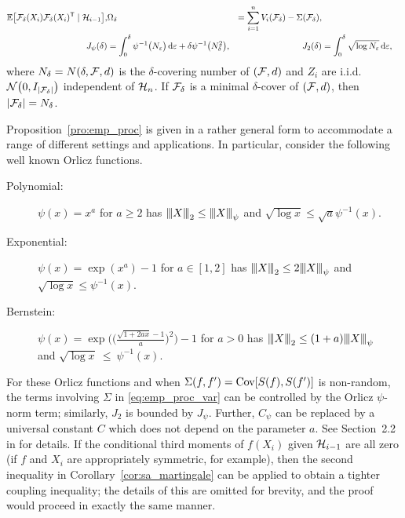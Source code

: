\begin{proposition}
\begin{align*}
    \mathbb{E}\big[\mathcal{F}_\delta(X_i) \mathcal{F}_\delta(X_i)^{\mathsf{T}} \mid \mathcal{H}_{i-1} \big],
    &
    \Omega_\delta
    &=
    \sum_{i=1}^n V_i(\mathcal{F}_\delta) - \Sigma(\mathcal{F}_\delta), \\
    J_\psi(\delta)
    &=
    \int_0^\delta \psi^{-1}\big( N_\varepsilon \big)
    \,\mathrm{d}\varepsilon
    + \delta \psi^{-1} \big( N_\delta^2 \big),
    &
    J_2(\delta)
    &= \int_0^\delta \sqrt{\log N_\varepsilon}
    \,\mathrm{d}\varepsilon,
  \end{align*}
  where $N_\delta = N(\delta, \mathcal{F}, d)$
  is the $\delta$-covering number of $(\mathcal{F}, d)$
  and $Z_i$ are i.i.d.\ $\mathcal{N}\big(0, I_{|\mathcal{F}_\delta|}\big)$
  independent of $\mathcal{H}_n$.
  If $\mathcal{F}_\delta$ is a minimal $\delta$-cover
  of $(\mathcal{F}, d)$, then $|\mathcal{F}_\delta| = N_\delta$.
\end{proposition}

Proposition~\ref{pro:emp_proc}
is given in a rather general form to accommodate a range of different
settings and applications.
In particular, consider the following well known Orlicz functions.
%
\begin{description}

  \item[Polynomial:]
    $\psi(x) = x^a$ for $a \geq 2$
    has ${\vert\kern-0.25ex\vert\kern-0.25ex\vert} X {\vert\kern-0.25ex\vert\kern-0.25ex\vert}_2 \leq {\vert\kern-0.25ex\vert\kern-0.25ex\vert} X {\vert\kern-0.25ex\vert\kern-0.25ex\vert}_\psi$ and
    $\sqrt{\log x} \leq \sqrt{a} \psi^{-1}(x)$.

  \item[Exponential:]
    $\psi(x) = \exp(x^a) - 1$ for $a \in [1,2]$
    has ${\vert\kern-0.25ex\vert\kern-0.25ex\vert} X {\vert\kern-0.25ex\vert\kern-0.25ex\vert}_2 \leq 2{\vert\kern-0.25ex\vert\kern-0.25ex\vert} X {\vert\kern-0.25ex\vert\kern-0.25ex\vert}_\psi$ and
    $\sqrt{\log x} \leq \psi^{-1}(x)$.

  \item[Bernstein:]
    $\psi(x) = \exp
    \Big(
      \Big(\frac{\sqrt{1+2ax}-1}{a}\Big)^{2}
    \Big)-1$
    for $a > 0$ has
    ${\vert\kern-0.25ex\vert\kern-0.25ex\vert} X {\vert\kern-0.25ex\vert\kern-0.25ex\vert}_2 \leq (1+a){\vert\kern-0.25ex\vert\kern-0.25ex\vert} X {\vert\kern-0.25ex\vert\kern-0.25ex\vert}_\psi$ \\ and
    $\sqrt{\log x}~\leq~\psi^{-1}(x)$.

\end{description}
%
For these Orlicz functions and when $\Sigma(f, f') = \operatorname{Cov}[S(f), S(f')]$ is
non-random, the terms involving $\Sigma$ in \eqref{eq:emp_proc_var} can be
controlled by the Orlicz $\psi$-norm term; similarly, $J_2$ is bounded by
$J_\psi$. Further, $C_\psi$ can be replaced by a universal constant $C$ which
does not depend on the parameter $a$. See Section~2.2 in \citet{van1996weak}
for details. If the conditional third moments of $f(X_i)$ given $\mathcal{H}_{i-1}$ are
all zero (if $f$ and $X_i$ are appropriately symmetric, for example), then the
second inequality in Corollary~\ref{cor:sa_martingale} can be applied to obtain
a tighter coupling inequality; the details of this are omitted for brevity, and
the proof would proceed in exactly the same manner.


